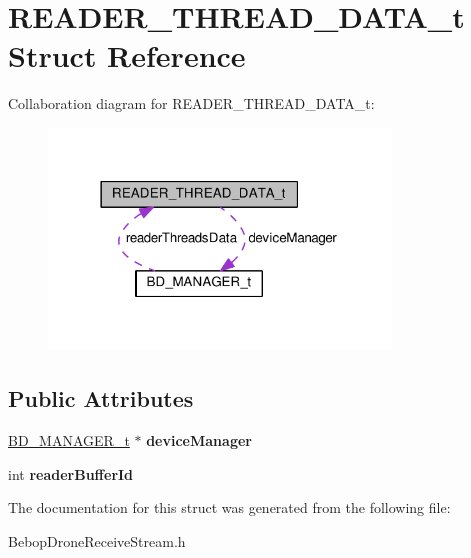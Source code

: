 \hypertarget{structREADER__THREAD__DATA__t}{}\section{R\+E\+A\+D\+E\+R\+\_\+\+T\+H\+R\+E\+A\+D\+\_\+\+D\+A\+T\+A\+\_\+t Struct Reference}
\label{structREADER__THREAD__DATA__t}


Collaboration diagram for R\+E\+A\+D\+E\+R\+\_\+\+T\+H\+R\+E\+A\+D\+\_\+\+D\+A\+T\+A\+\_\+t\+:
\nopagebreak
\begin{figure}[H]
\begin{center}
\leavevmode
\includegraphics[width=258pt]{structREADER__THREAD__DATA__t__coll__graph}
\end{center}
\end{figure}
\subsection*{Public Attributes}
\begin{DoxyCompactItemize}
\item 
\hypertarget{structREADER__THREAD__DATA__t_a5b41dd4679caf26ca0d348df673cbab1}{}\hyperlink{structBD__MANAGER__t}{B\+D\+\_\+\+M\+A\+N\+A\+G\+E\+R\+\_\+t} $\ast$ {\bfseries device\+Manager}\label{structREADER__THREAD__DATA__t_a5b41dd4679caf26ca0d348df673cbab1}

\item 
\hypertarget{structREADER__THREAD__DATA__t_a58c42dc9083eb1a735d5c14fcbe4d75c}{}int {\bfseries reader\+Buffer\+Id}\label{structREADER__THREAD__DATA__t_a58c42dc9083eb1a735d5c14fcbe4d75c}

\end{DoxyCompactItemize}


The documentation for this struct was generated from the following file\+:\begin{DoxyCompactItemize}
\item 
Bebop\+Drone\+Receive\+Stream.\+h\end{DoxyCompactItemize}
